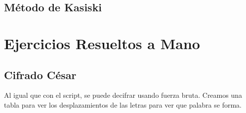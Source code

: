 \subsection{Método de Kasiski}


\section{Ejercicios Resueltos a Mano}


\subsection{Cifrado César}

Al igual que con el script, se puede decifrar usando fuerza bruta. Creamos una tabla para ver los
desplazamientos de las letras para ver que palabra se forma.


